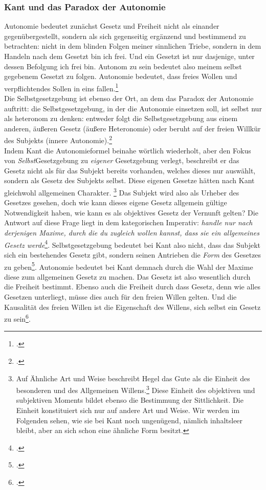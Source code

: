\documentclass[12pt, a4paper, openany]{report}
\begin{document}
\subsubsection{Kant und das Paradox der Autonomie}
Autonomie bedeutet zunächst Gesetz und Freiheit nicht als einander gegenübergestellt, sondern als sich gegenseitig ergänzend und bestimmend zu betrachten: 
nicht in dem blinden Folgen meiner sinnlichen Triebe, sondern in dem Handeln nach dem Gesetzt bin ich frei. 
Und ein Gesetzt ist nur dasjenige, unter dessen Befolgung ich frei bin. 
Autonom zu sein bedeutet also meinem selbst gegebenem Gesetzt zu folgen. 
Autonomie bedeutet, dass freies Wollen und verpflichtendes Sollen in eins fallen.\footcite[Vgl.][19]{menke_autonomie_2018}\\
Die Selbstgesetzgebung ist ebenso der Ort, an dem das Paradox der Autonomie auftritt: 
die Selbstgesetzgebung, in der die Autonomie einsetzen soll, ist selbst nur als heteronom zu denken: 
entweder folgt die Selbstgesetzgebung aus einem anderen, äußeren Gesetz (äußere Heteronomie) oder beruht auf der freien Willkür des Subjekts (innere Autonomie).\footcite[Vgl.][20]{menke_autonomie_2018}\\
Indem Kant die Autonomieformel beinahe wörtlich wiederholt, aber den Fokus von \textit{Selbst}Gesetzgebung zu \textit{eigener} Gesetzgebung verlegt, beschreibt er das Gesetz nicht als für das Subjekt bereits vorhanden, welches dieses nur auswählt, sondern als Gesetz des Subjekts selbst.
Diese eigenen Gesetze hätten nach Kant gleichwohl allgemeinen Charakter.
\footnote{
    \cite[Vgl.][65.]{kant_kritik_2014} 
    Auf Ähnliche Art und Weise beschreibt Hegel das Gute als die Einheit des besonderen und des Allgemeinen Willens.\footcite[Vgl.][§129, S. 134.]{hegel_grundlinien_2017}
    Diese Einheit des objektiven und subjektiven Moments bildet ebenso die Bestimmung der Sittlichkeit.
    Die Einheit konstituiert sich nur auf andere Art und Weise. 
    Wir werden im Folgenden sehen, wie sie bei Kant noch ungenügend, nämlich inhaltsleer bleibt, aber an sich schon eine ähnliche Form besitzt.
}
Das Subjekt wird also als Urheber des Gesetzes gesehen, doch wie kann dieses eigene Gesetz allgemein gültige Notwendigkeit haben, wie kann es als objektives Gesetz der Vernunft gelten?
Die Antwort auf diese Frage liegt in dem kategorischen Imperativ: \glqq \textit{handle nur nach derjenigen Maxime, durch die du zugleich wollen kannst, dass sie ein allgemeines Gesetz werde}\grqq\footcite[][51. Im Original gesperrt gedruckt]{kant_kritik_2014}.
Selbstgesetzgebung bedeutet bei Kant also nicht, dass das Subjekt sich ein bestehendes Gesetz gibt, sondern \glqq seinen Antrieben die \textit{Form} des Gesetzes zu geben\grqq\footcite[][24]{menke_autonomie_2018}.
Autonomie bedeutet bei Kant demnach durch die Wahl der Maxime diese zum allgemeinen Gesetz zu machen. 
Das Gesetz ist also wesentlich durch die Freiheit bestimmt.
Ebenso auch die Freiheit durch dass Gesetz, denn wie alles Gesetzen unterliegt, müsse dies auch für den freien Willen gelten.
Und die Kausalität des freien Willen ist \glqq die Eigenschaft des Willens, sich selbst ein Gesetz zu sein\grqq\footcite[][81]{kant_kritik_2014}.\\
\end{document}
